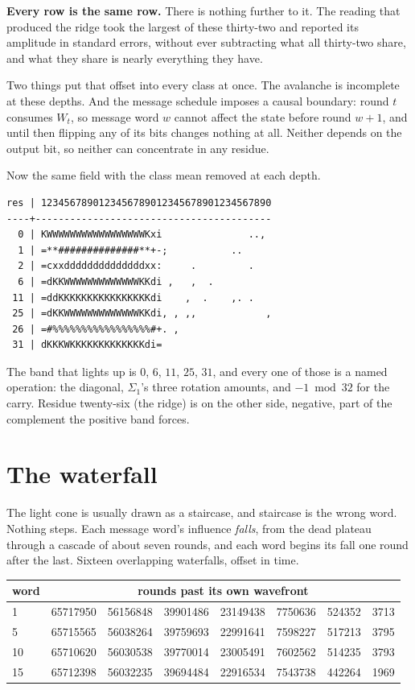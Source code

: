 \textbf{Every row is the same row.} There is nothing further to it. The reading that produced the ridge
took the largest of these thirty-two and reported its amplitude in standard errors, without ever
subtracting what all thirty-two share, and what they share is nearly everything they have.

Two things put that offset into every class at once. The avalanche is incomplete at these depths.
And the message schedule imposes a causal boundary: round \(t\) consumes \(W_t\), so message word
\(w\) cannot affect the state before round \(w+1\), and until then flipping any of its bits changes
nothing at all. Neither depends on the output bit, so neither can concentrate in any residue.

Now the same field with the class mean removed at each depth.

\begin{verbatim}
res | 1234567890123456789012345678901234567890
----+-----------------------------------------
  0 | KWWWWWWWWWWWWWWWWWKxi               ..,
  1 | =**##############**+-;           ..
  2 | =cxxddddddddddddddxx:     .         .
  6 | =dKKWWWWWWWWWWWWWKKdi ,   ,  .
 11 | =ddKKKKKKKKKKKKKKKKdi    ,  .    ,. .
 25 | =dKKWWWWWWWWWWWWWKKdi, , ,,            ,
 26 | =#%%%%%%%%%%%%%%%%%#+. ,
 31 | dKKKWKKKKKKKKKKKKKdi=
\end{verbatim}

The band that lights up is \(0\), \(6\), \(11\), \(25\), \(31\), and every one of those is a named
operation: the diagonal, \(\Sigma_1\)'s three rotation amounts, and \(-1 \bmod 32\) for the
carry. Residue twenty-six (the ridge) is on the other side, negative, part of the complement
the positive band forces.

\section{The waterfall}

The light cone is usually drawn as a staircase, and staircase is the wrong word. Nothing steps. Each
message word's influence \emph{falls}, from the dead plateau through a cascade of about seven
rounds, and each word begins its fall one round after the last. Sixteen overlapping waterfalls,
offset in time.

\begin{center}
\begin{tabular}{lrrrrrrr}
\toprule
word & \multicolumn{7}{c}{rounds past its own wavefront} \\
\midrule
1 & 65717950 & 56156848 & 39901486 & 23149438 & 7750636 & 524352 & 3713 \\
5 & 65715565 & 56038264 & 39759693 & 22991641 & 7598227 & 517213 & 3795 \\
10 & 65710620 & 56030538 & 39770014 & 23005491 & 7602562 & 514235 & 3793 \\
15 & 65712398 & 56032235 & 39694484 & 22916534 & 7543738 & 442264 & 1969 \\
\bottomrule
\end{tabular}
\end{center}

